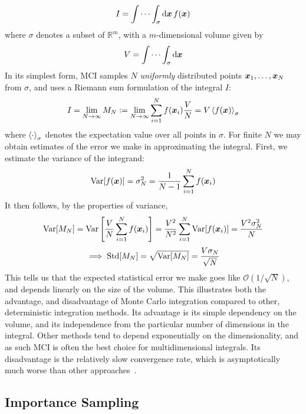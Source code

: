 \documentclass[Thesis.tex]{subfiles}
\begin{document}
\begin{align}
    I = \idotsint_\sigma\dd{\bm{x}} f(\bm{x})
\end{align}
where $\sigma$ denotes a subset of $\mathbb{R}^m$, with a $m$-dimensional volume given by
\begin{align}
    V = \idotsint_\sigma\dd{\bm{x}}
\end{align}
In its simplest form, MCI samples $N$ \emph{uniformly} distributed points
$\bm{x}_1,\dots,\bm{x}_N$ from $\sigma$, and uses a Riemann sum formulation of the integral $I$:
\begin{align}
    I = \lim_{N\to\infty} M_N \vcentcolon= \lim_{N\to\infty}\sum_{i=1}^N f(\bm{x}_i) \frac{V}{N} = V\expval{f(\bm{x})}_\sigma
\end{align}
where $\expval{\cdot}_\sigma$ denotes the expectation value over all points in $\sigma$. For finite $N$ we may obtain estimates of the error we make in approximating the integral. First, we estimate the variance of the integrand:
\begin{align}
    \operatorname{Var}[f(\bm{x})] = \sigma^2_N = \frac{1}{N-1} \sum_{i=1}^Nf(\bm{x}_i)
\end{align}
It then follows, by the properties of variance,
\begin{align}
    \operatorname{Var}[M_N] = \operatorname{Var}\qty[ \frac{V}{N} \sum_{i=1}^Nf(\bm{x}_i)] = \frac{V^2}{N^2}\sum_{i=1}^N\operatorname{Var}[f(\bm{x}_i)] = \frac{V^2\sigma^2_N}{N}
\end{align}
\begin{align}
    \implies \operatorname{Std}[M_N] = \sqrt{\operatorname{Var}[M_N]} = \frac{V\sigma_N}{\sqrt N}
\end{align}
This tells us that the expected statistical error we make goes like
$\mathcal{O}(1 / \sqrt N)$, and depends linearly on the size of the volume.
This illustrates both the advantage, and disadvantage of Monte Carlo
integration compared to other, deterministic integration methods. Its advantage
is its simple dependency on the volume, and its independence from the
particular number of dimensions in the integral. Other methods tend to depend
exponentially on the dimensionality, and as such MCI is often the best choice
for multidimensional integrals. Its disadvantage is the relatively slow
convergence rate, which is asymptotically much worse than other
approaches~\cite{Numerical-Recipes-Press-et-al}.

\subsection{Importance Sampling}
\end{document}
